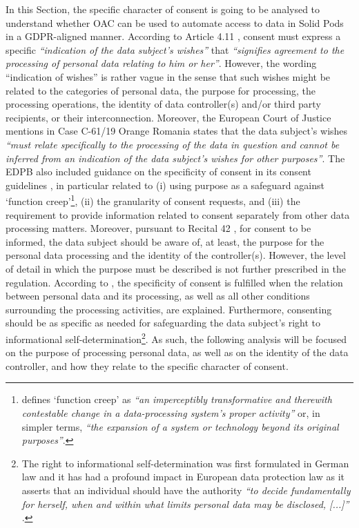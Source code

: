 In this Section, the specific character of consent is going to be analysed to understand whether OAC can be used to automate access to data in Solid Pods in a GDPR-aligned manner.
According to Article 4.11 \citeyearpar{noauthor_regulation_2016}, consent must express a specific \textit{``indication of the data subject’s wishes''} that \textit{``signifies agreement to the processing of personal data relating to him or her''}.
However, the wording ``indication of wishes'' is rather vague in the sense that such wishes might be related to the categories of personal data, the purpose for processing, the processing operations, the identity of data controller(s) and/or third party recipients, or their interconnection.
Moreover, the European Court of Justice mentions in Case C-61/19 Orange Romania \citeyearpar{noauthor_orange_2020} states that the data subject’s wishes \textit{``must relate specifically to the processing of the data in question and cannot be inferred from an indication of the data subject’s wishes for other purposes''}.
The EDPB also included guidance on the specificity of consent in its consent guidelines \citep{european_data_protection_board_guidelines_2020}, in particular related to (i) using purpose as a safeguard against `function creep'\footnote{\cite{koops_concept_2021} defines `function creep' as \textit{``an imperceptibly transformative and therewith contestable change in a data-processing system's proper activity''} or, in simpler terms, \textit{``the expansion of a system or technology beyond its original purposes''}.}, (ii) the granularity of consent requests, and (iii) the requirement to provide information related to consent separately from other data processing matters.
Moreover, pursuant to Recital 42 \citeyearpar{noauthor_regulation_2016}, for consent to be informed, the data subject should be aware of, at least, the purpose for the personal data processing and the identity of the controller(s). 
However, the level of detail in which the purpose must be described is not further prescribed in the regulation.
According to \cite{kosta_consent_2013}, the specificity of consent is fulfilled when the relation between personal data and its processing, as well as all other conditions surrounding the processing activities, are explained.
Furthermore, consenting should be as specific as needed for safeguarding the data subject's right to informational self-determination\footnote{The right to informational self-determination was first formulated in German law and it has had a profound impact in European data protection law as it asserts that an individual should have the authority \textit{``to decide fundamentally for herself, when and within what limits personal data may be disclosed, [...]''} \citep{vivarelli_crisis_2020}.}.
As such, the following analysis will be focused on the purpose of processing personal data, as well as on the identity of the data controller, and how they relate to the specific character of consent.

